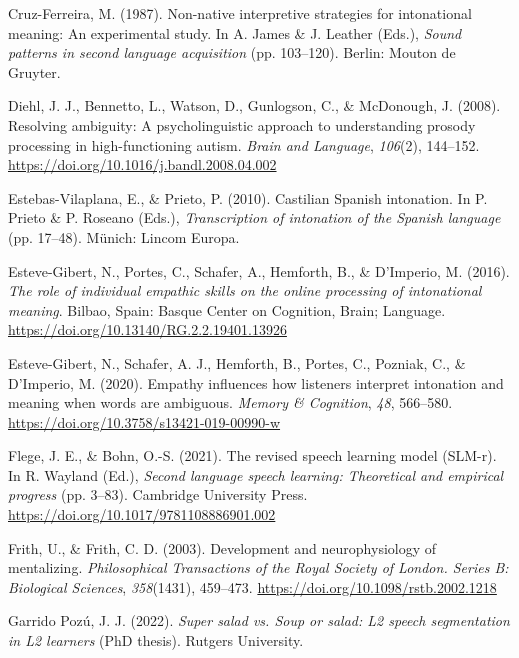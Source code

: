 \documentclass[]{article}
\newlength{\cslhangindent}
\newenvironment{CSLReferences}[2] %
 {%
  \setlength{\parindent}{0pt}
  \ifodd #1 \everypar{\setlength{\hangindent}{\cslhangindent}}\ignorespaces\fi
  \ifnum #2 > 0
  \setlength{\parskip}{#2\baselineskip}
  \fi
 }%
 {}
\begin{document}
\begin{CSLReferences}{1}{0}
\leavevmode{}%
Cruz-Ferreira, M. (1987). Non-native interpretive strategies for intonational meaning: An experimental study. In A. James \& J. Leather (Eds.), \emph{Sound patterns in second language acquisition} (pp. 103--120). Berlin: Mouton de Gruyter.

\leavevmode{}%
Diehl, J. J., Bennetto, L., Watson, D., Gunlogson, C., \& McDonough, J. (2008). Resolving ambiguity: {A} psycholinguistic approach to understanding prosody processing in high-functioning autism. \emph{Brain and Language}, \emph{106}(2), 144--152. \url{https://doi.org/10.1016/j.bandl.2008.04.002}

\leavevmode{}%
Estebas-Vilaplana, E., \& Prieto, P. (2010). Castilian {S}panish intonation. In P. Prieto \& P. Roseano (Eds.), \emph{Transcription of intonation of the {S}panish language} (pp. 17--48). Münich: Lincom Europa.

\leavevmode{}%
Esteve-Gibert, N., Portes, C., Schafer, A., Hemforth, B., \& D'Imperio, M. (2016). \emph{The role of individual empathic skills on the online processing of intonational meaning}. Bilbao, Spain: Basque Center on Cognition, Brain; Language. \url{https://doi.org/10.13140/RG.2.2.19401.13926}

\leavevmode{}%
Esteve-Gibert, N., Schafer, A. J., Hemforth, B., Portes, C., Pozniak, C., \& D'Imperio, M. (2020). Empathy influences how listeners interpret intonation and meaning when words are ambiguous. \emph{Memory \& Cognition}, \emph{48}, 566--580. \url{https://doi.org/10.3758/s13421-019-00990-w}

\leavevmode{}%
Flege, J. E., \& Bohn, O.-S. (2021). The revised speech learning model (SLM-r). In R. Wayland (Ed.), \emph{Second language speech learning: Theoretical and empirical progress} (pp. 3--83). Cambridge University Press. \url{https://doi.org/10.1017/9781108886901.002}

\leavevmode{}%
Frith, U., \& Frith, C. D. (2003). Development and neurophysiology of mentalizing. \emph{Philosophical Transactions of the Royal Society of London. Series B: Biological Sciences}, \emph{358}(1431), 459--473. \url{https://doi.org/10.1098/rstb.2002.1218}

\leavevmode{}%
Garrido Pozú, J. J. (2022). \emph{Super salad vs. Soup or salad: {L}2 speech segmentation in L2 learners} (PhD thesis). Rutgers University.


\end{CSLReferences}
\end{document}
